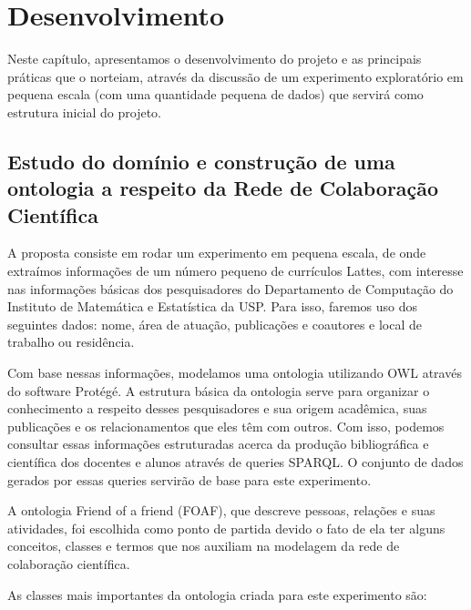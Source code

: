 \chapter{Desenvolvimento}
\label{cap:desenvolvimento}

Neste capítulo, apresentamos o desenvolvimento do projeto e as principais práticas que o norteiam, através da discussão de um experimento exploratório em pequena escala (com uma quantidade pequena de dados) que servirá como estrutura inicial do projeto.

\section{Estudo do domínio e construção de uma ontologia a respeito da Rede de Colaboração Científica}
\label{sec:desenvolvimento-ontologia}

A proposta consiste em rodar um experimento em pequena escala, de onde extraímos informações de um número pequeno de currículos Lattes, com interesse nas informações básicas dos pesquisadores do Departamento de Computação do Instituto de Matemática e Estatística da USP. Para isso, faremos uso dos seguintes dados: nome, área de atuação, publicações e coautores e local de trabalho ou residência.

Com base nessas informações, modelamos uma ontologia utilizando OWL através do software Protégé. A estrutura básica da ontologia serve para organizar o conhecimento a respeito desses pesquisadores e sua origem acadêmica, suas publicações e os relacionamentos que eles têm com outros. Com isso, podemos consultar essas informações estruturadas acerca da produção bibliográfica e científica dos docentes e alunos através de queries SPARQL. O conjunto de dados gerados por essas queries servirão de base para este experimento.

A ontologia Friend of a friend (FOAF), que descreve pessoas, relações e suas atividades, foi escolhida como ponto de partida devido o fato de ela ter alguns conceitos, classes e termos que nos auxiliam na modelagem da rede de colaboração científica.

As classes mais importantes da ontologia criada para este experimento são:

